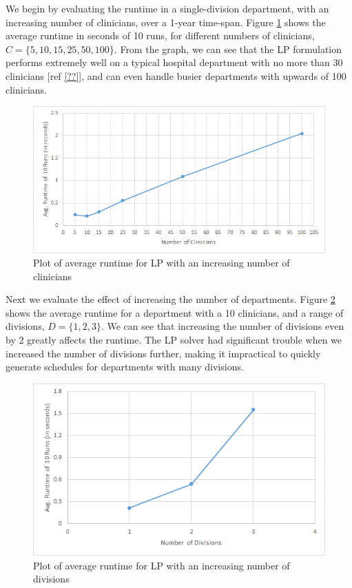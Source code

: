 We begin by evaluating the runtime in a single-division department, with an increasing number of clinicians, over a 1-year time-span. Figure \ref{fig:avg-runtime-clinicians} shows the average runtime in seconds of 10 runs, for different numbers of clinicians, $C = \{5, 10, 15, 25, 50, 100\}$. From the graph, we can see that the LP formulation performs extremely well on a typical hospital department with no more than 30 clinicians [ref \ref{??}], and can even handle busier departments with upwards of 100 clinicians. \\

\begin{figure}[h]
	\centering
	\includegraphics[scale=.7]{fig/avg_runtime_clinicians}
	\caption{Plot of average runtime for LP with an increasing number of clinicians}
	\label{fig:avg-runtime-clinicians}
\end{figure}

Next we evaluate the effect of increasing the number of departments. Figure \ref{fig:avg-runtime-divisions} shows the average runtime for a department with a 10 clinicians, and a range of divisions, $D = \{1, 2, 3\}$. We can see that increasing the number of divisions even by 2 greatly affects the runtime. The LP solver had significant trouble when we increased the number of divisions further, making it impractical to quickly generate schedules for departments with many divisions. \\

\begin{figure}[h]
	\centering
	\includegraphics[scale=.7]{fig/avg_runtime_divisions}
	\caption{Plot of average runtime for LP with an increasing number of divisions}
	\label{fig:avg-runtime-divisions}
\end{figure}

